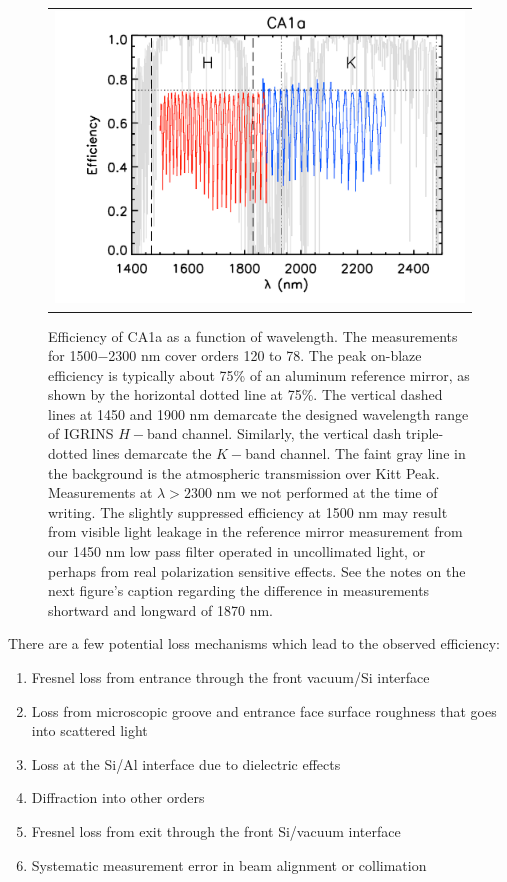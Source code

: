 \begin{figure}
\begin{center}
 \begin{tabular}{c}
    \includegraphics[width=1.0\textwidth]{chSPIE_2012_CA1/figs/CA1a_1500_2300_eff.pdf}
   \end{tabular}
  \end{center}
  \caption[CA1a Efficiency]{\label{fig:CA1a-efficiency} Efficiency of CA1a as a function of wavelength.  The measurements for 1500$-$2300 nm cover orders 120 to 78.  The peak on-blaze efficiency is typically about 75\% of an aluminum reference mirror, as shown by the horizontal dotted line at 75\%.  The vertical dashed lines at 1450 and 1900 nm demarcate the designed wavelength range of IGRINS $H-$band channel.  Similarly, the vertical dash triple-dotted lines demarcate the $K-$band channel.  The faint gray line in the background is the atmospheric transmission over Kitt Peak\cite{hinkle1995}.  Measurements at $\lambda > 2300 $ nm we not performed at the time of writing.  The slightly suppressed efficiency at 1500 nm may result from visible light leakage in the reference mirror measurement from our 1450 nm low pass filter operated in uncollimated light, or perhaps from real polarization sensitive effects.  See the notes on the next figure's caption regarding the difference in measurements shortward and longward of 1870 nm.}
\end{figure}

 There are a few potential loss mechanisms which lead to the observed efficiency:
\begin{enumerate}
\item Fresnel loss from entrance through the front vacuum/Si interface
\item Loss from microscopic groove and entrance face surface roughness that goes into scattered light
\item Loss at the Si/Al interface due to dielectric effects
\item Diffraction into other orders
\item Fresnel loss from exit through the front Si/vacuum interface
\item Systematic measurement error in beam alignment or collimation
\end{enumerate}

